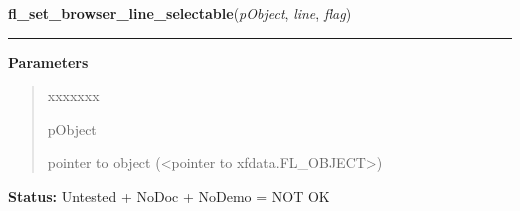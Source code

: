    \label{xformslib:library:fl_set_browser_line_selectable}

    \vspace{0.5ex}

\hspace{.8\funcindent}\begin{boxedminipage}{\funcwidth}

    \raggedright \textbf{fl\_set\_browser\_line\_selectable}(\textit{pObject}, \textit{line}, \textit{flag})

    \vspace{-1.5ex}

    \rule{\textwidth}{0.5\fboxrule}
\setlength{\parskip}{2ex}
\setlength{\parskip}{1ex}
      \textbf{Parameters}
      \vspace{-1ex}

      \begin{quote}
        \begin{Ventry}{xxxxxxx}

          \item[pObject]

          pointer to object ({\textless}pointer to 
          xfdata.FL\_OBJECT{\textgreater})

        \end{Ventry}

      \end{quote}

\textbf{Status:} Untested + NoDoc + NoDemo = NOT OK



    \end{boxedminipage}

    \label{xformslib:library:fl_get_browser_dimension}

    \vspace{0.5ex}

